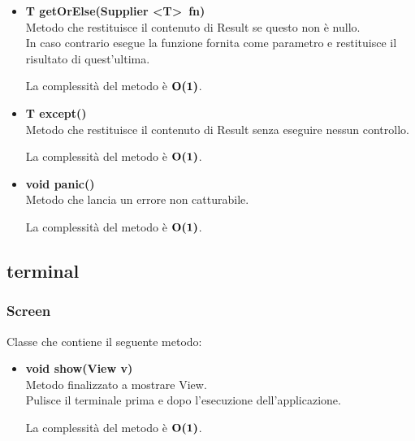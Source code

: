 \documentclass[a4paper, 12pt]{scrreprt}
\begin{document}
\begin{itemize}
					\item \textbf{T getOrElse(Supplier \textless T\textgreater~fn)}
					\\Metodo che restituisce il contenuto di Result se questo non \`e nullo.
					\\In caso contrario esegue la funzione fornita come parametro e restituisce il risultato di quest'ultima.
					
					La complessit\`a del metodo \`e $\mathbf{O}\textbf{(1)}$.
	
					\item \textbf{T except()}
					\\Metodo che restituisce il contenuto di Result senza eseguire nessun controllo.
					
					La complessit\`a del metodo \`e $\mathbf{O}\textbf{(1)}$.
	
					\item \textbf{void panic()}
					\\Metodo che lancia un errore non catturabile.
					
					La complessit\`a del metodo \`e $\mathbf{O}\textbf{(1)}$.
					
				\end{itemize}

			\subsection{terminal}
				\subsubsection{Screen}
				Classe che contiene il seguente metodo:
				\begin{itemize}
					\item \textbf{void show(View v)}
					\\Metodo finalizzato a mostrare View.
					\\Pulisce il terminale prima e dopo l'esecuzione dell'applicazione.
					
					La complessit\`a del metodo \`e $\mathbf{O}\textbf{(1)}$.
					
				\end{itemize}
\end{document}

